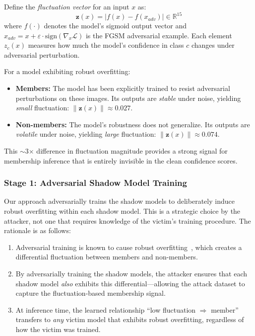 \documentclass[conference]{IEEEtran}
\begin{document}
Define the \textit{fluctuation vector} for an input $x$ as:
\begin{equation}
    \mathbf{z}(x) = \left| f(x) - f(x_{adv}) \right| \in \mathbb{R}^{15}
\end{equation}
where $f(\cdot)$ denotes the model's sigmoid output vector and $x_{adv} = x + \varepsilon \cdot \text{sign}(\nabla_x \mathcal{L})$ is the FGSM adversarial example. Each element $z_c(x)$ measures how much the model's confidence in class $c$ changes under adversarial perturbation.

For a model exhibiting robust overfitting:
\begin{itemize}[leftmargin=*]
    \item \textbf{Members:} The model has been explicitly trained to resist adversarial perturbations on these images. Its outputs are \textit{stable} under noise, yielding \textit{small} fluctuation: $\|\mathbf{z}(x)\| \approx 0.027$.
    \item \textbf{Non-members:} The model's robustness does not generalize. Its outputs are \textit{volatile} under noise, yielding \textit{large} fluctuation: $\|\mathbf{z}(x)\| \approx 0.074$.
\end{itemize}

This $\sim$3$\times$ difference in fluctuation magnitude provides a strong signal for membership inference that is entirely invisible in the clean confidence scores.



\subsubsection{Stage 1: Adversarial Shadow Model Training}

Our approach adversarially trains the shadow models to deliberately induce robust overfitting within each shadow model. This is a strategic choice by the attacker, not one that requires knowledge of the victim's training procedure. The rationale is as follows:

\begin{enumerate}[leftmargin=*]
    \item Adversarial training is known to cause robust overfitting~\cite{rice2020overfitting}, which creates a differential fluctuation between members and non-members.
    \item By adversarially training the shadow models, the attacker ensures that each shadow model \textit{also} exhibits this differential---allowing the attack dataset to capture the fluctuation-based membership signal.
    \item At inference time, the learned relationship ``low fluctuation $\Rightarrow$ member'' transfers to \textit{any} victim model that exhibits robust overfitting, regardless of how the victim was trained.
\end{enumerate}
\end{document}
